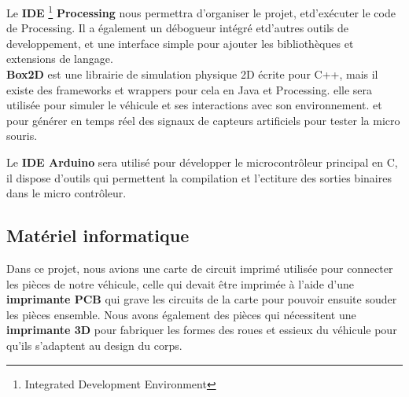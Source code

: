  
   Le \textbf{IDE} \footnote{Integrated Development Environment}
\textbf{Processing} nous permettra d'organiser le projet, etd'exécuter le
code de Processing.  Il a également un débogueur intégré etd'autres
outils de developpement, et une interface simple pour ajouter
les bibliothèques et extensions de langage. \\ 


   \textbf{Box2D} est une librairie de simulation physique 2D écrite pour C++,
mais il existe des frameworks et wrappers pour cela en Java et Processing.
elle sera utilisée pour simuler le véhicule et ses interactions avec son
environnement. et pour générer en temps réel des signaux de capteurs
artificiels pour tester la micro souris. \\


   Le \textbf{IDE Arduino} sera utilisé pour développer le microcontrôleur
principal en C, il dispose d'outils qui permettent la compilation et
l'ectiture des sorties binaires dans le micro contrôleur. \\

\subsection{Matériel informatique} \label{subsec:hardDev}
Dans ce projet, nous avions une carte de circuit imprimé utilisée pour
connecter les pièces de notre véhicule, celle qui devait être imprimée à l'aide
d'une \textbf{imprimante PCB} qui grave les circuits de la carte pour pouvoir
ensuite souder les pièces ensemble. Nous avons également des pièces qui
nécessitent une \textbf{imprimante 3D} pour fabriquer les formes des roues et
essieux du véhicule pour qu'ils s'adaptent au design du corps.    